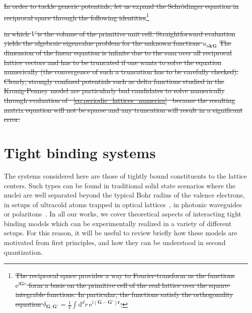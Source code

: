 \documentclass{svmono}
\def\ri{\mathrm i}
\def\re{\mathrm e}
\def\rd{\mathrm d}
\providecommand{\DIFdeltex}[1]{{\protect\color{red}\sout{#1}}}                      %
\providecommand{\DIFdelbegin}{} %
\providecommand{\DIFdelend}{} %
\providecommand{\DIFdel}[1]{\texorpdfstring{\DIFdeltex{#1}}{}} %
\newcommand{\DIFscaledelfig}{0.5}
\newlength{\DIFdelgraphicswidth} %
\newlength{\DIFdelgraphicsheight} %
\newcommand{\DIFdelincludegraphics}[2][]{%
\sbox{\DIFdelgraphicsbox}{\DIFOincludegraphics[#1]{#2}}%
\settoboxwidth{\DIFdelgraphicswidth}{\DIFdelgraphicsbox} %
\settoboxtotalheight{\DIFdelgraphicsheight}{\DIFdelgraphicsbox} %
\scalebox{\DIFscaledelfig}{%
\parbox[b]{\DIFdelgraphicswidth}{\usebox{\DIFdelgraphicsbox}\\[-\baselineskip] \rule{\DIFdelgraphicswidth}{0em}}\llap{\resizebox{\DIFdelgraphicswidth}{\DIFdelgraphicsheight}{%
\setlength{\unitlength}{\DIFdelgraphicswidth}%
\begin{picture}(1,1)%
\thicklines\linethickness{2pt} %
{\color[rgb]{1,0,0}\put(0,0){\framebox(1,1){}}}%
{\color[rgb]{1,0,0}\put(0,0){\line( 1,1){1}}}%
{\color[rgb]{1,0,0}\put(0,1){\line(1,-1){1}}}%
\end{picture}%
}\hspace*{3pt}}} %
} %
\DeclareRobustCommand{\DIFdelbegin}{\DIFOdelbegin \let\includegraphics\DIFdelincludegraphics} %
\DeclareRobustCommand{\DIFdelend}{\DIFOaddend \let\includegraphics\DIFOincludegraphics} %
\begin{document}
\DIFdelbegin \DIFdel{In order to tackle generic potentials, let us expand the Schrödinger equation in reciprocal space through the following identities}\footnote{\DIFdel{The reciprocal space provides a way to Fourier-transform as the functions $\re^{\ri {\bm G r}}$ form a basis on the primitive cell of the real lattice over the square-integrable functions. In particular, the functions satisfy the orthogonality equation $\delta_{\bm G, \bm G'}=\frac1{V}\int\rd^dr\,\re^{\ri({\bm G-\bm G'}){\bm r}}$.}}
\addtocounter{footnote}{-1}%
\DIFdel{in which $V$ is the volume of the primitive unit cell.
Straightforward evaluation yields the algebraic eigenvalue problem for the unknown functions $u_{n{\bm k}}{}_{\bm G}$
}%
\DIFdel{The dimension of the linear equation is infinite due to the sum over all reciprocal lattice vectors and has to be truncated if one wants to solve the equation numerically (the convergence of such a truncation has to be carefully checked).
Clearly, strongly confined potentials such as delta functions studied in the Kronig-Penney model are particularly bad candidates to solve numerically through evaluation of \mbox{%
\cref{eq:periodic_lattices_numerics} }\hspace{0pt}%
because the resulting matrix equation will not be sparse and any truncation will result in a significant error.
}\DIFdelend \section{Tight binding systems}
\label{sec:tight_binding_systems}
The systems considered here are those of tightly bound constituents to the lattice centers.
Such types can be found in traditional solid state scenarios where the nuclei are well separated beyond the typical Bohr radius of the valence electrons, in setups of ultracold atoms trapped in optical lattices~\cite{Bloch2008}, in photonic waveguides~\cite{Lu2014} or polaritons~\cite{Amo2016}.
In all our works, we cover theoretical aspects of interacting tight binding models which can be experimentally realized in a variety of different setups.
For this reason, it will be useful to review briefly how these models are motivated from first principles, and how they can be understood in second quantization.
\end{document}
